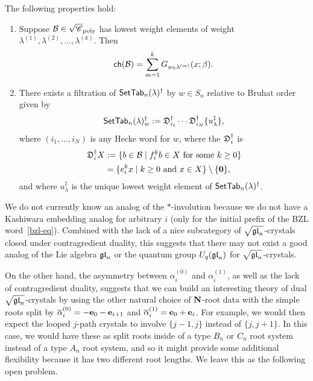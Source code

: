 \documentclass[11pt]{article}
\begin{document}
\begin{corollary}
The following properties hold:

\begin{enumerate}
\item[(a)] Suppose $\mathcal{B} \in \sqrt{\mathscr{C}}_{\operatorname{poly}}$ has lowest weight elements of weight $\lambda^{(1)},\lambda^{(2)}, \dotsc, \lambda^{(k)}$. Then
\[
\mathsf{ch}(\mathcal{B}) = \sum_{m=1}^k G_{w_0\lambda^{(m)}}(x; \beta).
\]
\item[(b)] There exists a filtration of $\mathsf{SetTab}_n(\lambda)^{\dagger}$ by $w \in S_n$ relative to Bruhat order given by
\[
\mathsf{SetTab}_n(\lambda)^{\dagger}_w := \mathfrak{D}_{i_1}^{\dagger} \cdots \mathfrak{D}_{i_N}^{\dagger} \{u_{\lambda}^{\ddagger}\},
\]
where $(i_1, \dotsc, i_N)$ is any Hecke word for $w$, where the  $\mathfrak{D}_i^{\dagger}$ is
\begin{subequations}
\begin{align}
\mathfrak{D}^{\dagger}_i X & := \{ b \in \mathcal{B} \mid f_i^k b\in X\text{ for some }k \geq 0\}
\\ & = \{ e_i^k x \mid k\geq 0 \text{ and } x \in X\} \setminus\{\boldsymbol{0}\},
\end{align}
\end{subequations}
and where $u_{\lambda}^{\ddagger}$ is the unique lowest weight element of $\mathsf{SetTab}_n(\lambda)^{\dagger}$.
\end{enumerate}
\end{corollary}


We do not currently know an analog of the $*$-involution because we do not have a Kashiwara embedding analog for arbitrary $i$ (only for the initial prefix of the BZL word~\eqref{bzl-eq}).
Combined with the lack of a nice subcategory of $\sqrt{\mathfrak{gl}_n}$-crystals closed under contragredient duality, this suggests that there may not exist a good analog of the Lie algebra $\mathfrak{gl}_n$ or the quantum group $U_q(\mathfrak{gl}_n)$ for $\sqrt{\mathfrak{gl}_n}$-crystals.

On the other hand, the asymmetry between $\alpha_i^{(0)}$ and $\alpha_i^{(1)}$, as well as the lack of contragredient duality, suggests that we can build an interesting theory of dual $\sqrt{\mathfrak{gl}_n}$-crystals by using the other natural choice of $\mathbf{N}$-root data with the simple roots split by $\overline{\alpha}_i^{(0)} = -\textbf{e}_0 - \textbf{e}_{i+1}$ and $\overline{\alpha}_i^{(1)} = \textbf{e}_0 + \textbf{e}_i$.
For example, we would then expect the looped $j$-path crystals to involve $\{j-1, j\}$ instead of $\{j, j+1\}$.
In this case, we would have these as split roots inside of a type $B_n$ or $C_n$ root system instead of a type $A_n$ root system, and so it might provide some additional flexibility because it has two different root lengths.
We leave this as the following open problem.
\end{document}
